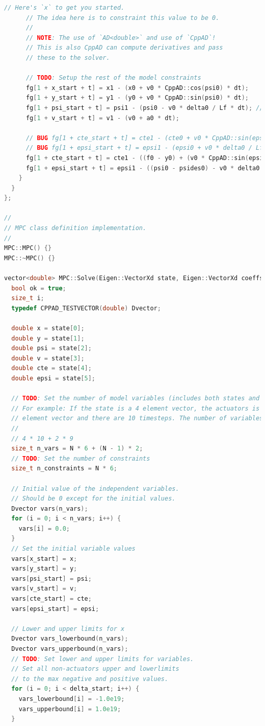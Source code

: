 \documentclass[11pt]{article}
\begin{document}
\begin{lstlisting}[language=C++, caption={MPC solver with ipopt}]
      // Here's `x` to get you started.
      // The idea here is to constraint this value to be 0.
      //
      // NOTE: The use of `AD<double>` and use of `CppAD`!
      // This is also CppAD can compute derivatives and pass
      // these to the solver.

      // TODO: Setup the rest of the model constraints
      fg[1 + x_start + t] = x1 - (x0 + v0 * CppAD::cos(psi0) * dt);
      fg[1 + y_start + t] = y1 - (y0 + v0 * CppAD::sin(psi0) * dt);
      fg[1 + psi_start + t] = psi1 - (psi0 - v0 * delta0 / Lf * dt); // XXX + -> - (as received from simulator)
      fg[1 + v_start + t] = v1 - (v0 + a0 * dt);

      // BUG fg[1 + cte_start + t] = cte1 - (cte0 + v0 * CppAD::sin(epsi0) * dt);
      // BUG fg[1 + epsi_start + t] = epsi1 - (epsi0 + v0 * delta0 / Lf * dt);
      fg[1 + cte_start + t] = cte1 - ((f0 - y0) + (v0 * CppAD::sin(epsi0) * dt));
      fg[1 + epsi_start + t] = epsi1 - ((psi0 - psides0) - v0 * delta0 / Lf * dt); // XXX + -> -
    }
  }
};

//
// MPC class definition implementation.
//
MPC::MPC() {}
MPC::~MPC() {}

vector<double> MPC::Solve(Eigen::VectorXd state, Eigen::VectorXd coeffs) {
  bool ok = true;
  size_t i;
  typedef CPPAD_TESTVECTOR(double) Dvector;

  double x = state[0];
  double y = state[1];
  double psi = state[2];
  double v = state[3];
  double cte = state[4];
  double epsi = state[5];

  // TODO: Set the number of model variables (includes both states and inputs).
  // For example: If the state is a 4 element vector, the actuators is a 2
  // element vector and there are 10 timesteps. The number of variables is:
  //
  // 4 * 10 + 2 * 9
  size_t n_vars = N * 6 + (N - 1) * 2;
  // TODO: Set the number of constraints
  size_t n_constraints = N * 6;

  // Initial value of the independent variables.
  // Should be 0 except for the initial values.
  Dvector vars(n_vars);
  for (i = 0; i < n_vars; i++) {
    vars[i] = 0.0;
  }
  // Set the initial variable values
  vars[x_start] = x;
  vars[y_start] = y;
  vars[psi_start] = psi;
  vars[v_start] = v;
  vars[cte_start] = cte;
  vars[epsi_start] = epsi;

  // Lower and upper limits for x
  Dvector vars_lowerbound(n_vars);
  Dvector vars_upperbound(n_vars);
  // TODO: Set lower and upper limits for variables.
  // Set all non-actuators upper and lowerlimits
  // to the max negative and positive values.
  for (i = 0; i < delta_start; i++) {
    vars_lowerbound[i] = -1.0e19;
    vars_upperbound[i] = 1.0e19;
  }


\end{lstlisting}
\end{document}
